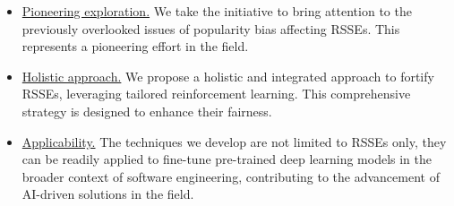 \begin{itemize}

	\item \underline{Pioneering exploration.} We take the initiative to bring attention to the previously overlooked issues of popularity bias affecting RSSEs. This represents a pioneering effort in the field.

	\item \underline{Holistic approach.} We propose a holistic and integrated approach to fortify RSSEs, leveraging tailored reinforcement learning. This comprehensive strategy is designed to enhance their fairness. %

	\item \underline{Applicability.} The techniques we develop are not limited to RSSEs only, they can be readily applied to fine-tune pre-trained deep learning models in the broader context of software engineering, contributing to the advancement of AI-driven solutions in the field.

\end{itemize}


\vspace{-.4cm}






